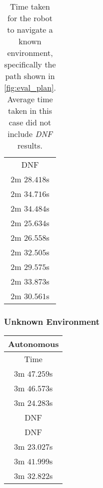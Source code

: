 \begin{appendices}
\begin{table}[!h]
\begin{tabular}{ c }
		DNF \\
				
		$2$m $28.418$s \\

		$2$m $34.716$s \\

		$2$m $34.484$s \\

		$2$m $25.634$s \\

		$2$m $26.558$s \\

		$2$m $32.505$s \\

		$2$m $29.575$s \\

		$2$m $33.873$s \\

		\midrule
		$2$m $30.561$s \\
		\bottomrule
	\end{tabular}
	\caption{Time taken for the robot to navigate a known environment, specifically the path shown in \autoref{fig:eval_plan}. Average time taken in this case did not include \emph{DNF} results.}
	\label{tab:eval_nav_cp_known}
\end{table}

\subsubsection{Unknown Environment}

\begin{table}[!h]
	\centering
	\begin{tabular}{ c }
		\toprule
		\textbf{Autonomous} \\
		\midrule
		Time \\
		\midrule
		$3$m $47.259$s \\

		$3$m $46.573$s \\

		$3$m $24.283$s \\

		DNF \\

		DNF \\

		$3$m $23.027$s \\

		$3$m $41.999$s \\

		$3$m $32.822$s \\


\end{tabular}
\end{table}
\end{appendices}
